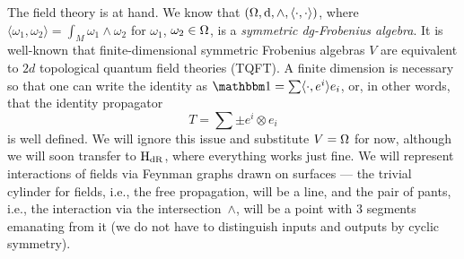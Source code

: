 \documentclass[\MainFolder/Text.tex]{subfiles}
\begin{document}
The field theory is at hand.
We know that $(\Omega,\mathrm{d},\wedge,\langle\cdot,\cdot\rangle)$, where $\langle\omega_1,\omega_2\rangle = \int_M \omega_1 \wedge \omega_2$ for $\omega_1$, $\omega_2\in \Omega$, is a \emph{symmetric dg-Frobenius algebra}.
It is well-known that finite-dimensional symmetric Frobenius algebras $V$ are equivalent to $2d$ topological quantum field theories (TQFT).
A finite dimension is necessary so that one can write the identity as $\Id = \sum \langle \cdot,e^i\rangle e_i$, or, in other words, that the identity propagator 
\[
T = \sum \pm e^i\otimes e_i
\]
is well defined.
We will ignore this issue and substitute $V=\Omega$ for now, although we will soon transfer to $\mathrm{H}_{\mathrm{dR}}$, where everything works just fine.
We will represent interactions of fields via Feynman graphs drawn on surfaces --- the trivial cylinder for fields, i.e., the free propagation, will be a line, and the pair of pants, i.e., the interaction via the intersection~$\wedge$, will be a point with $3$ segments emanating from it (we do not have to distinguish inputs and outputs by cyclic symmetry).
\end{document}

